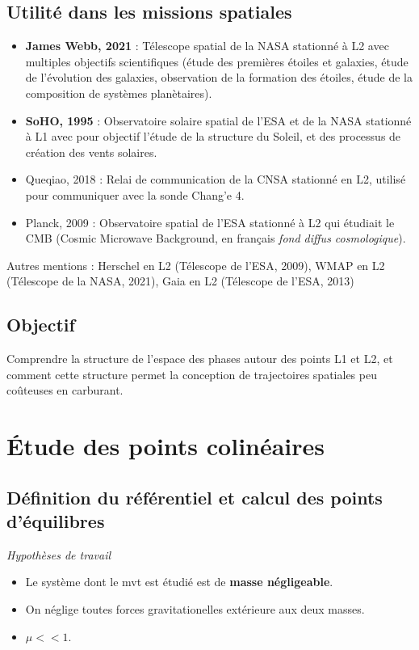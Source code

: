 \documentclass[12pt]{article}
\begin{document}
	
	\subsection{Utilité dans les missions spatiales}
	\begin{itemize}
		\item \textbf{James Webb, 2021} : Télescope spatial de la NASA stationné à L2 avec multiples objectifs scientifiques (étude des premières étoiles et galaxies, étude de l'évolution des galaxies, observation de la formation des étoiles, étude de la composition de systèmes planètaires).
		\item \textbf{SoHO, 1995} : Observatoire solaire spatial de l'ESA et de la NASA stationné à L1 avec pour objectif l'étude de la structure du Soleil, et des processus de création des vents solaires.
		\item Queqiao, 2018 : Relai de communication de la CNSA stationné en L2, utilisé pour communiquer avec la sonde Chang'e 4.
		\item Planck, 2009 : Observatoire spatial de l'ESA stationné à L2 qui étudiait le CMB (Cosmic Microwave Background, en français \textit{fond diffus cosmologique}).
	\end{itemize}
	Autres mentions : Herschel en L2 (Télescope de l'ESA, 2009), WMAP en L2 (Télescope de la NASA, 2021), Gaia en L2 (Télescope de l'ESA, 2013)
	
	\subsection{Objectif}
	Comprendre la structure de l'espace des phases autour des points L1 et L2, et comment cette structure permet la conception de trajectoires spatiales peu coûteuses en carburant.
	
	
	\clearpage
	\section{Étude des points colinéaires}
	\subsection{Définition du référentiel et calcul des points d'équilibres}
	\textit{Hypothèses de travail}
	\begin{itemize}
		\item Le système dont le mvt est étudié est de \textbf{masse négligeable}.
		\item On néglige toutes forces gravitationelles extérieure aux deux masses.
		\item $\mu << 1$.
	\end{itemize}
	
\end{document}
